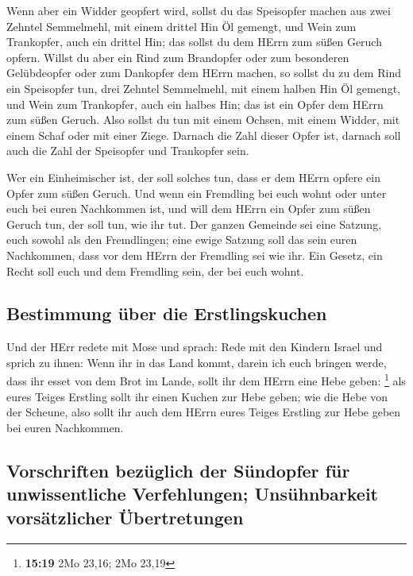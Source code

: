  Wenn aber ein Widder geopfert wird, sollst du das
Speisopfer machen aus zwei Zehntel Semmelmehl, mit einem drittel Hin Öl
gemengt,  und Wein zum Trankopfer, auch ein drittel Hin;
das sollst du dem HErrn zum süßen Geruch opfern.  Willst
du aber ein Rind zum Brandopfer oder zum besonderen Gelübdeopfer oder
zum Dankopfer dem HErrn machen,  so sollst du zu dem Rind
ein Speisopfer tun, drei Zehntel Semmelmehl, mit einem halben Hin Öl
gemengt,  und Wein zum Trankopfer, auch ein halbes Hin;
das ist ein Opfer dem HErrn zum süßen Geruch.  Also
sollst du tun mit einem Ochsen, mit einem Widder, mit einem Schaf oder
mit einer Ziege.  Darnach die Zahl dieser Opfer ist,
darnach soll auch die Zahl der Speisopfer und Trankopfer sein.

 Wer ein Einheimischer ist, der soll solches tun, dass er
dem HErrn opfere ein Opfer zum süßen Geruch.  Und wenn
ein Fremdling bei euch wohnt oder unter euch bei euren Nachkommen ist,
und will dem HErrn ein Opfer zum süßen Geruch tun, der soll tun, wie ihr
tut.  Der ganzen Gemeinde sei eine Satzung, euch sowohl
als den Fremdlingen; eine ewige Satzung soll das sein euren Nachkommen,
dass vor dem HErrn der Fremdling sei wie ihr.  Ein
Gesetz, ein Recht soll euch und dem Fremdling sein, der bei euch wohnt.

\hypertarget{bestimmung-uxfcber-die-erstlingskuchen}{%
\subsection{Bestimmung über die
Erstlingskuchen}\label{bestimmung-uxfcber-die-erstlingskuchen}}

 Und der HErr redete mit Mose und sprach: 
Rede mit den Kindern Israel und sprich zu ihnen: Wenn ihr in das Land
kommt, darein ich euch bringen werde,  dass ihr esset von
dem Brot im Lande, sollt ihr dem HErrn eine Hebe geben: \footnote{\textbf{15:19}
  2Mo 23,16; 2Mo 23,19}  als eures Teiges Erstling sollt
ihr einen Kuchen zur Hebe geben; wie die Hebe von der Scheune,
 also sollt ihr auch dem HErrn eures Teiges Erstling zur
Hebe geben bei euren Nachkommen.

\hypertarget{vorschriften-bezuxfcglich-der-suxfcndopfer-fuxfcr-unwissentliche-verfehlungen-unsuxfchnbarkeit-vorsuxe4tzlicher-uxfcbertretungen}{%
\subsection{Vorschriften bezüglich der Sündopfer für unwissentliche
Verfehlungen; Unsühnbarkeit vorsätzlicher
Übertretungen}\label{vorschriften-bezuxfcglich-der-suxfcndopfer-fuxfcr-unwissentliche-verfehlungen-unsuxfchnbarkeit-vorsuxe4tzlicher-uxfcbertretungen}}

